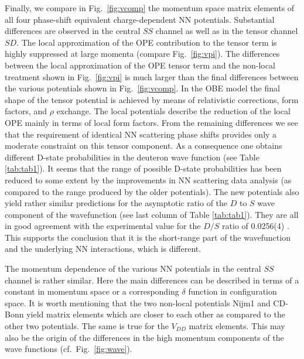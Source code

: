 Finally, we compare in Fig.\ \ref{fig:vcomp} 
the momentum space matrix elements of
all four phase-shift equivalent charge-dependent NN potentials. Substantial
differences are observed in the central $SS$ channel as well as in the tensor
channel $SD$. The local approximation of the OPE contribution to the tensor
term is highly suppressed at large momenta (compare Fig.\ \ref{fig:vpi}). The
differences between the local approximation of the OPE tensor term and the
non-local treatment shown in Fig.\ \ref{fig:vpi} is much larger than the
final differences between the various potentials shown 
in Fig.\ \ref{fig:vcomp}.
In the OBE model the final shape of the tensor potential  is achieved 
by means of relativistic corrections, form factors, and $\rho$ exchange. The
local potentials describe the reduction of the local OPE mainly in terms 
of local form factors. From the remaining differences we see that the 
requirement of identical NN  scattering phase shifts
provides only a moderate constraint on this tensor component. As a consequence 
one obtains different D-state probabilities in the deuteron 
wave function (see
Table \ref{tab:tab1}). It seems that the range of 
possible D-state probabilities
has been reduced to some extent by the improvements in NN scattering data
analysis (as compared to the range produced by the older potentials). The new
potentials also yield rather similar predictions for the asymptotic ratio of 
the $D$ to $S$ wave component of the wavefunction (see last column of Table 
\ref{tab:tab1}). They are all in good agreement with the experimental value for 
the $D/S$ ratio of 0.0256(4) \cite{expds}. This supports the conclusion that it
is the short-range part of the wavefunction and the underlying NN interactions,
which is different.

The momentum dependence of the various NN potentials in the 
central $SS$ channel
is rather similar. Here the main differences can be described in terms of a
constant in momentum space or a corresponding 
$\delta$ function in configuration
space. It is worth mentioning that the two non-local potentials Nijm1 and 
CD-Bonn 
yield matrix elements which are closer to each other as compared to
the other two potentials.
The same is true for the $V_{DD}$ matrix elements. This may also be the origin 
of the differences in the high momentum components of the wave functions
(cf.\ Fig.\ \ref{fig:wave}).
  

